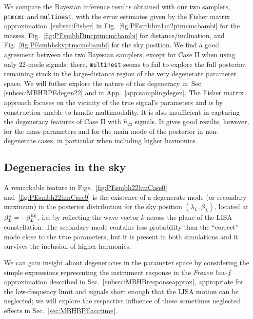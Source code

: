 \documentclass[aps,showpacs,twocolumn,prd,superscriptaddress,nofootinbib]{revtex4-1}
\begin{document}
We compare the Bayesian inference results obtained with our two samplers, \texttt{ptmcmc} and \texttt{multinest}, with the error estimates given by the Fisher matrix approximation~\ref{subsec:Fisher} in Fig.~\ref{fig:PEsmbhm1m2ptmcmcbambi} for the masses, Fig.~\ref{fig:PEsmbhDincptmcmcbambi} for distance/inclination, and Fig.~\ref{fig:PEsmbhskyptmcmcbambi} for the sky position. We find a good agreement between the two Bayesian samplers, except for Case II when using only 22-mode signals: there, \texttt{multinest} seems to fail to explore the full posterior, remaining stuck in the large-distance region of the very degenerate parameter space. We will futher explore the nature of this degeneracy in~Sec.\ref{subsec:MBHBPEdegen22} and in App.~\ref{app:samplingdegen}. The Fisher matrix approach focuses on the vicinity of the true signal's parameters and is by construction unable to handle multimodality. It is also insufficient in capturing the degeneracy features of Case II with $h_{22}$ signals. It gives good results, however, for the mass parameters and for the main mode of the posterior in non-degenerate cases, in particular when including higher harmonics.


\subsection{Degeneracies in the sky}
\label{subsec:MBHBPEdegen}

A remarkable feature in Figs.~\ref{fig:PEsmbh22hmCase0} and~\ref{fig:PEsmbh22hmCase9} is the existence of a degenerate mode (or secondary maximum) in the posterior distribution for the sky position $(\lambda_{L}, \beta_{L})$, located at $\beta_{L}^{*} = -\beta_{L}^{\rm inj}$, i.e. by reflecting the wave vector $k$ across the plane of the LISA constellation.
The secondary mode contains less probability than the ``correct'' mode close to the true parameters, but it is present in both simulations and it survives the inclusion of higher harmonics.

We can gain insight about degeneracies in the parameter space by considering the simple expressions representing the instrument response in the \textit{Frozen low-$f$} approximation described in Sec.~\ref{subsec:MBHBresponseapprox}, appropriate for the low-frequency limit and signals short enough that the LISA motion can be neglected; we will explore the respective influence of these sometimes neglected effects in Sec.~\ref{sec:MBHBPEacctime}.
\end{document}
